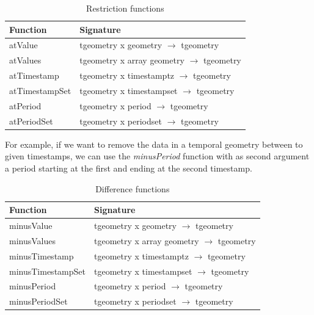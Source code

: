 \begin{table}[h!]
    \centering
    \begin{tabularx}{\textwidth}{|l|X|}
    \hline
    \textbf{Function}   & \textbf{Signature} \\ 
    \hline
    atValue             & tgeometry x geometry $\rightarrow$ tgeometry\\
    \hline
    atValues            & tgeometry x array geometry $\rightarrow$ tgeometry\\
    \hline
    atTimestamp         & tgeometry x timestamptz $\rightarrow$ tgeometry \\
    \hline
    atTimestampSet      & tgeometry x timestampset $\rightarrow$ tgeometry \\
    \hline
    atPeriod            & tgeometry x period $\rightarrow$ tgeometry \\
    \hline
    atPeriodSet         & tgeometry x periodset $\rightarrow$ tgeometry \\
    \hline
    \end{tabularx}
    \caption{Restriction functions}
    \label{table:restriction_funcs}
\end{table}

For example, if we want to remove the data in a temporal geometry between to given timestamps, we can use the \textit{minusPeriod} function with as second argument a period starting at the first and ending at the second timestamp.

\begin{table}[h!]
    \centering
    \begin{tabularx}{\textwidth}{|l|X|}
    \hline
    \textbf{Function}   & \textbf{Signature} \\ 
    \hline
    minusValue             & tgeometry x geometry $\rightarrow$ tgeometry\\
    \hline
    minusValues            & tgeometry x array geometry $\rightarrow$ tgeometry\\
    \hline
    minusTimestamp         & tgeometry x timestamptz $\rightarrow$ tgeometry \\
    \hline
    minusTimestampSet      & tgeometry x timestampset $\rightarrow$ tgeometry \\
    \hline
    minusPeriod            & tgeometry x period $\rightarrow$ tgeometry \\
    \hline
    minusPeriodSet         & tgeometry x periodset $\rightarrow$ tgeometry \\
    \hline
    \end{tabularx}
    \caption{Difference functions}
    \label{table:diff_funcs}
\end{table}

